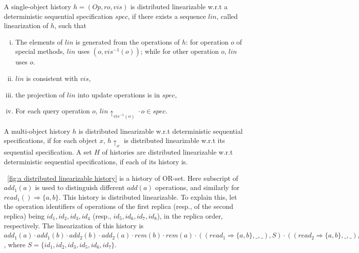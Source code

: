 \begin{definition}
\label{definition:distributed linearizability}

A single-object history $h = (\mathit{Op},\mathit{ro},\mathit{vis})$ is distributed linearizable w.r.t a deterministic sequential specification $\mathit{spec}$, if there exists a sequence $\mathit{lin}$, called linearization of $h$, such that

\begin{enumerate}[(i)]
\item The elements of $\mathit{lin}$ is generated from the operations of $h$: for operation $o$ of special methods, $\mathit{lin}$ uses $(o,\mathit{vis}^{-1}(o))$; while for other operation $o$, $\mathit{lin}$ uses $o$.
\item $\mathit{lin}$ is consistent with $\mathit{vis}$,
\item the projection of $\mathit{lin}$ into update operations is in $\mathit{spec}$,
\item For each query operation $o$, $\mathit{lin} \uparrow_{ \mathit{vis}^{-1}(o)  } \cdot o \in \mathit{spec}$.
\end{enumerate}

A multi-object history $h$ is distributed linearizable w.r.t deterministic sequential specifications, if for each object $x$, $h \uparrow_{x}$ is distributed linearizable w.r.t its sequential specification. A set $H$ of histories are distributed linearizable w.r.t deterministic sequential specifications, if each of its history is.
\end{definition}

\figurename~\ref{fig:a distributed linearizable history} is a history of OR-set. Here subscript of $\mathit{add}_1(a)$ is used to distinguish different $\mathit{add}(a)$ operations, and similarly for $\mathit{read}_1() \Rightarrow \{ a,b \}$. This history is distributed linearizable. To explain this, let the operation identifiers of operations of the first replica (resp., of the second replica) being $\mathit{id}_1,\mathit{id}_2,\mathit{id}_3,\mathit{id}_4$ (resp., $\mathit{id}_5,\mathit{id}_6,\mathit{id}_7,\mathit{id}_8$), in the replica order, respectively. The linearization of this history is $\mathit{add}_1(a) \cdot \mathit{add}_1(b) \cdot \mathit{add}_2(b) \cdot \mathit{add}_2(a) \cdot \mathit{rem}(b) \cdot \mathit{rem}(a) \cdot ((\mathit{read}_1 \Rightarrow \{ a,b \},\_,\_), S ) \cdot ((\mathit{read}_2 \Rightarrow \{ a,b \},\_,\_), S )$, where $S = \{ \mathit{id}_1, \mathit{id}_2, \mathit{id}_3, \mathit{id}_5, \mathit{id}_6, \mathit{id}_7 \}$.

